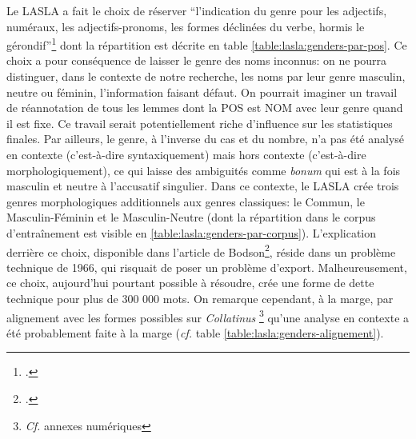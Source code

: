 Le LASLA a fait le choix de réserver \enquote{l'indication du genre pour les adjectifs, numéraux, les adjectifs-pronoms, les formes déclinées du verbe, hormis le gérondif}\footcite[p.~27]{BodsonCodification1966} dont la répartition est décrite en table \ref{table:lasla:genders-par-pos}. Ce choix a pour conséquence de laisser le genre des noms inconnus: on ne pourra distinguer, dans le contexte de notre recherche, les noms par leur genre masculin, neutre ou féminin, l'information faisant défaut. On pourrait imaginer un travail de réannotation de tous les lemmes dont la POS est NOM avec leur genre quand il est fixe. Ce travail serait potentiellement riche d'influence sur les statistiques finales. Par ailleurs, le genre, à l'inverse du cas et du nombre, n'a pas été analysé en contexte (c'est-à-dire syntaxiquement) mais hors contexte (c'est-à-dire morphologiquement), ce qui laisse des ambiguités comme \textit{bonum} qui est à la fois masculin et neutre à l'accusatif singulier. Dans ce contexte, le LASLA crée trois genres morphologiques additionnels aux genres classiques: le Commun, le Masculin-Féminin et le Masculin-Neutre (dont la répartition dans le corpus d'entraînement est visible en \ref{table:lasla:genders-par-corpus}). L'explication derrière ce choix, disponible dans l'article de Bodson\footcite{BodsonCodification1966}, réside dans un problème technique de 1966, qui risquait de poser un problème d'export. Malheureusement, ce choix, aujourd'hui pourtant possible à résoudre, crée une forme de dette technique pour plus de 300 000 mots. On remarque cependant, à la marge, par alignement avec les formes possibles sur \textit{Collatinus} \footnote{\textit{Cf.} annexes numériques} qu'une analyse en contexte a été probablement faite à la marge (\textit{cf.} table \ref{table:lasla:genders-alignement}).

